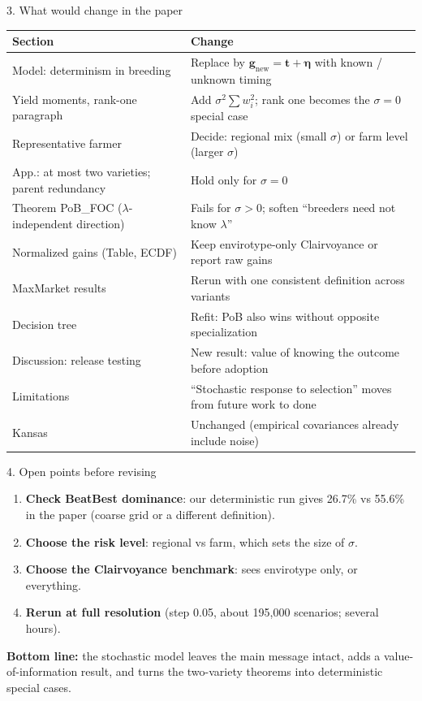 \documentclass[aspectratio=169,10pt]{beamer}
\newcommand{\bg}{\mathbf{g}}
\begin{document}
\begin{frame}{3. What would change in the paper}
\small
\begin{tabular}{p{}p{}}
\toprule
\textbf{Section} & \textbf{Change}\\
\midrule
Model: determinism in breeding & Replace by $\bg_{\text{new}}=\mathbf t+\boldsymbol\eta$ with known / unknown timing\\
Yield moments, rank-one paragraph & Add $\sigma^2\sum w_i^2$; rank one becomes the $\sigma=0$ special case\\
Representative farmer & Decide: regional mix (small $\sigma$) or farm level (larger $\sigma$)\\
App.: at most two varieties; parent redundancy & Hold only for $\sigma=0$\\
Theorem PoB\_FOC ($\lambda$-independent direction) & Fails for $\sigma>0$; soften ``breeders need not know $\lambda$''\\
Normalized gains (Table, ECDF) & Keep envirotype-only Clairvoyance or report raw gains\\
MaxMarket results & Rerun with one consistent definition across variants\\
Decision tree & Refit: PoB also wins without opposite specialization\\
Discussion: release testing & New result: value of knowing the outcome before adoption\\
Limitations & ``Stochastic response to selection'' moves from future work to done\\
Kansas & Unchanged (empirical covariances already include noise)\\
\bottomrule
\end{tabular}
\end{frame}

\begin{frame}{4. Open points before revising}
\begin{enumerate}
\item \textbf{Check BeatBest dominance}: our deterministic run gives 26.7\% vs 55.6\% in the paper (coarse grid or a different definition).
\item \textbf{Choose the risk level}: regional vs farm, which sets the size of $\sigma$.
\item \textbf{Choose the Clairvoyance benchmark}: sees envirotype only, or everything.
\item \textbf{Rerun at full resolution} (step 0.05, about 195{,}000 scenarios; several hours).
\end{enumerate}
\vspace{4mm}
\textbf{Bottom line:} the stochastic model leaves the main message intact, adds a value-of-information result, and turns the two-variety theorems into deterministic special cases.
\end{frame}
\end{document}
